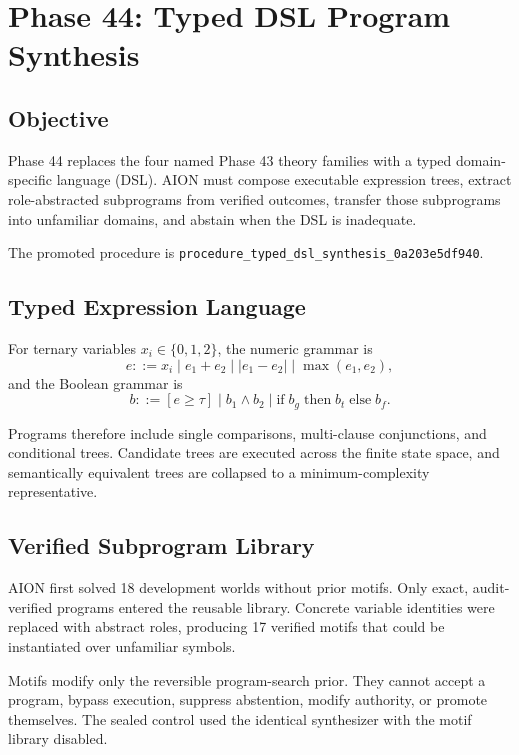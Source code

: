 \section{Phase 44: Typed DSL Program Synthesis}
\label{sec:hexcore-phase44}

\subsection{Objective}

Phase 44 replaces the four named Phase 43 theory families with a typed
domain-specific language (DSL). AION must compose executable expression trees,
extract role-abstracted subprograms from verified outcomes, transfer those
subprograms into unfamiliar domains, and abstain when the DSL is inadequate.

The promoted procedure is
\texttt{procedure\_typed\_dsl\_synthesis\_0a203e5df940}.

\subsection{Typed Expression Language}

For ternary variables $x_i\in\{0,1,2\}$, the numeric grammar is
\begin{equation}
  e ::= x_i
  \mid e_1+e_2
  \mid |e_1-e_2|
  \mid \max(e_1,e_2),
\end{equation}
and the Boolean grammar is
\begin{equation}
  b ::= [e\geq\tau]
  \mid b_1\land b_2
  \mid \mathrm{if}\;b_g\;\mathrm{then}\;b_t\;\mathrm{else}\;b_f.
\end{equation}

Programs therefore include single comparisons, multi-clause conjunctions, and
conditional trees. Candidate trees are executed across the finite state space,
and semantically equivalent trees are collapsed to a minimum-complexity
representative.

\subsection{Verified Subprogram Library}

AION first solved 18 development worlds without prior motifs. Only exact,
audit-verified programs entered the reusable library. Concrete variable
identities were replaced with abstract roles, producing 17 verified motifs
that could be instantiated over unfamiliar symbols.

Motifs modify only the reversible program-search prior. They cannot accept a
program, bypass execution, suppress abstention, modify authority, or promote
themselves. The sealed control used the identical synthesizer with the motif
library disabled.

